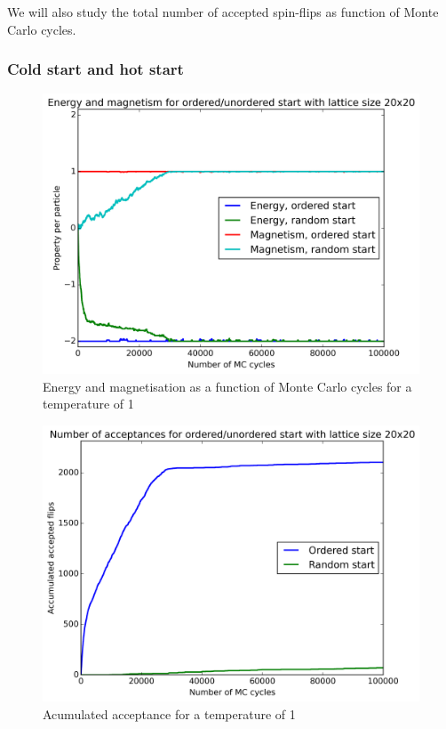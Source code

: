 \documentclass[11pt,a4paper,english]{article}
\numberwithin{equation}{section}
\newcommand{\figurewidth}{.85\textwidth}
\begin{document}
We will also study the total number of accepted spin-flips as function of 
Monte Carlo cycles.

\subsubsection{Cold start and hot start}

\begin{figure}
\centering
\includegraphics[width=\figurewidth]{pics/pics4report/cEM1.png}
\caption{Energy and magnetisation as a function of Monte Carlo cycles
for a temperature of 1}
\label{fig:EM_low_T}
\end{figure}

\begin{figure}
\centering
\includegraphics[width=\figurewidth]{pics/pics4report/cA1.png}
\caption{Acumulated acceptance 
for a temperature of 1}
\label{fig:ca_low_T}
\end{figure}
\end{document}
